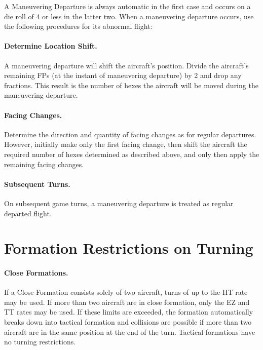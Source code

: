 A Maneuvering Departure is always automatic in the first case and occurs on a die roll of 4 or less in the latter two.  When a maneuvering departure occurs, use the following procedures for its abnormal flight:

\paragraph{Determine Location Shift.} A maneuvering departure will shift the aircraft's position. Divide the aircraft's remaining FPs (at the instant of maneuvering departure) by 2 and drop any fractions. This result is the number of hexes the aircraft will be moved during the maneuvering departure.

\paragraph{Facing Changes.} Determine the direction and quantity of facing changes as for regular departures. However, initially make only the first facing change, then shift the aircraft the required number of hexes determined as described above, and only then apply the remaining facing changes.


\paragraph{Subsequent Turns.} On subsequent game turns, a maneuvering departure is treated as regular departed flight.

\section{Formation Restrictions on Turning}

\paragraph{Close Formations.} If a Close Formation consists solely of two aircraft, turns of up to the HT rate may be used. If more than two aircraft are in close formation, only the EZ and TT rates may be used. If these limits are exceeded, the formation automatically breaks down into tactical formation and collisions are possible if more than two aircraft are in the same position at the end of the turn. Tactical formations have no turning restrictions.